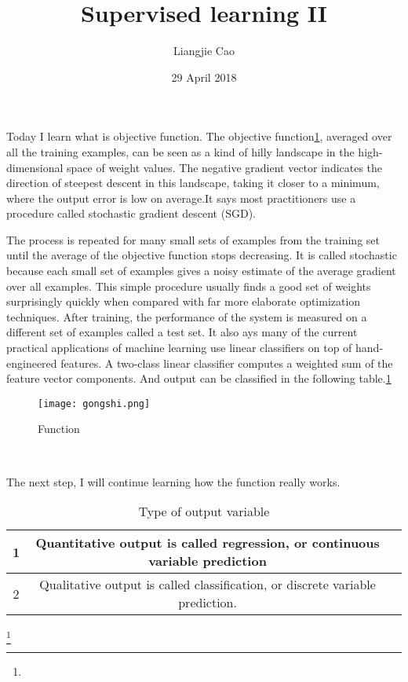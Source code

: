 \documentclass[50pt]{article}
\begin{document}
\title{Supervised learning II}
\author{Liangjie Cao}
\date{29 April 2018}
\maketitle
\par
Today I learn what is objective function. The objective function\ref{Figure}, averaged over all the training examples, can be seen as a kind of hilly landscape in the high-dimensional space of weight values. The negative gradient vector indicates the direction of steepest descent in this landscape, taking it closer to a minimum, where the output error is low on average.\cite{name1}It says most practitioners use a procedure called stochastic gradient descent (SGD). \\
\par
The process is repeated for many small sets of examples from the training set until the average of the objective function stops decreasing. It is called stochastic because each small set of examples gives a noisy estimate of the average gradient over all examples. This simple procedure usually finds a good set of weights surprisingly quickly when compared with far more elaborate optimization techniques.\cite{name2} After training, the performance of the system is measured on a different set of examples called a test set. It also ays many of the current practical applications of machine learning use linear classifiers on top of hand-engineered features. A two-class linear classifier computes a weighted sum of the feature vector components. And output can be classified in the following table.\ref{Table}
 \begin{figure}[ht]
 \centering
 \texttt{[image: gongshi.png]}\\
 \caption{Function}\label{Figure}
\end{figure}\\
\par
The next step, I will continue learning how the function really works. \\
 \begin{table}[!htbp]
  \centering
 \begin{tabular}{|c|c|c|}
    \hline
     1 & Quantitative output is called regression, or continuous variable prediction\\
  \hline
     2 & Qualitative output is called classification, or discrete variable prediction. \\
   \hline
  \end{tabular}
  \caption{Type of output variable}\label{Table}
  \end{table}
\footnote{
}
\end{document}
